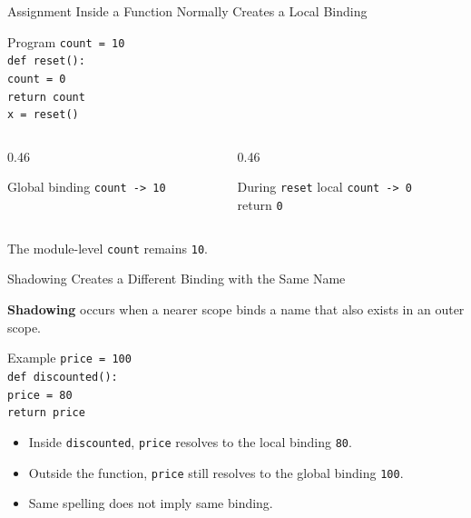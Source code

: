 \documentclass[aspectratio=169,10pt]{beamer}
\begin{document}
\begin{frame}{Assignment Inside a Function Normally Creates a Local Binding}
  \begin{block}{Program}
    \texttt{count = 10}\\[0.06in]
    \texttt{def reset():}\\
    \hspace*{0.20in}\texttt{count = 0}\\
    \hspace*{0.20in}\texttt{return count}\\[0.08in]
    \texttt{x = reset()}
  \end{block}

  \begin{columns}[T,onlytextwidth]
    \begin{column}{0.46\textwidth}
      \begin{block}{Global binding}
        \texttt{count -> 10}
      \end{block}
    \end{column}

    \begin{column}{0.46\textwidth}
      \begin{block}{During \texttt{reset}}
        local \texttt{count -> 0}\\
        return \texttt{0}
      \end{block}
    \end{column}
  \end{columns}

  The module-level \texttt{count} remains \texttt{10}.
\end{frame}

\begin{frame}{Shadowing Creates a Different Binding with the Same Name}
  \begin{cpdefinition}
    \textbf{Shadowing} occurs when a nearer scope binds a name that also exists in an outer scope.
  \end{cpdefinition}

  \begin{block}{Example}
    \texttt{price = 100}\\[0.06in]
    \texttt{def discounted():}\\
    \hspace*{0.20in}\texttt{price = 80}\\
    \hspace*{0.20in}\texttt{return price}
  \end{block}

  \begin{itemize}
    \item Inside \texttt{discounted}, \texttt{price} resolves to the local binding \texttt{80}.
    \item Outside the function, \texttt{price} still resolves to the global binding \texttt{100}.
    \item Same spelling does not imply same binding.
  \end{itemize}
\end{frame}
\end{document}
